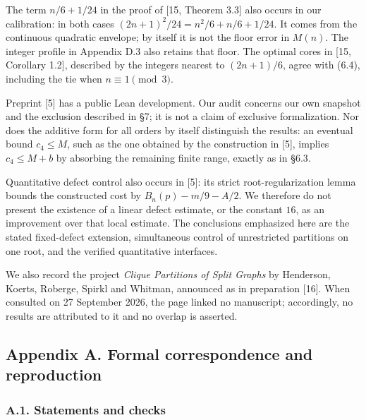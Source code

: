 \documentclass[english,11pt,a4paper]{article}
\begin{document}
The term \(n/6+1/24\) in the proof of {[}15, Theorem 3.3{]} also occurs in our calibration: in both cases \((2n+1)^2/24=n^2/6+n/6+1/24\). It comes from the continuous quadratic envelope; by itself it is not the floor error in \(M(n)\). The integer profile in Appendix D.3 also retains that floor. The optimal cores in {[}15, Corollary 1.2{]}, described by the integers nearest to \((2n+1)/6\), agree with (6.4), including the tie when \(n\equiv1\pmod3\).

Preprint {[}5{]} has a public Lean development. Our audit concerns our own snapshot and the exclusion described in §7; it is not a claim of exclusive formalization. Nor does the additive form for all orders by itself distinguish the results: an eventual bound \(c_4\le M\), such as the one obtained by the construction in {[}5{]}, implies \(c_4\le M+b\) by absorbing the remaining finite range, exactly as in §6.3.

Quantitative defect control also occurs in {[}5{]}: its strict root-regularization lemma bounds the constructed cost by \(B_n(p)-m/9-A/2\). We therefore do not present the existence of a linear defect estimate, or the constant \(16\), as an improvement over that local estimate. The conclusions emphasized here are the stated fixed-defect extension, simultaneous control of unrestricted partitions on one root, and the verified quantitative interfaces.

We also record the project \emph{Clique Partitions of Split Graphs} by Henderson, Koerts, Roberge, Spirkl and Whitman, announced as in preparation {[}16{]}. When consulted on 27 September 2026, the page linked no manuscript; accordingly, no results are attributed to it and no overlap is asserted.

\subsection{Appendix A. Formal correspondence and reproduction}\label{appendix-a.-formal-correspondence-and-reproduction}

\subsubsection{A.1. Statements and checks}\label{a.1.-statements-and-checks}
\end{document}

